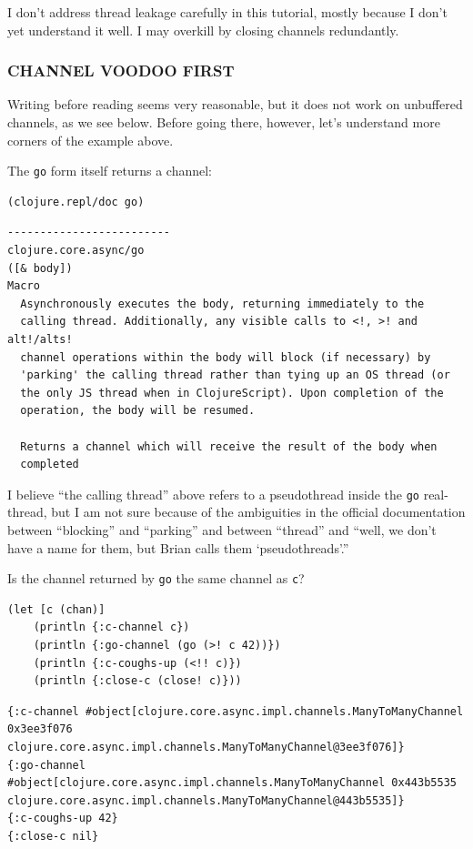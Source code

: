 \documentclass[10pt,oneside,x11names]{article}
\begin{document}
I don't address thread leakage carefully in this tutorial, mostly
because I don't yet understand it well. I may overkill by closing
channels redundantly.

\subsubsection{CHANNEL VOODOO FIRST}
\label{channel-voodoo-first}
Writing before reading seems very reasonable, but it does not work on
unbuffered channels, as we see below. Before going there, however, let's
understand more corners of the example above.

The \texttt{go} form itself returns a channel:

\begin{verbatim}
(clojure.repl/doc go)
\end{verbatim}

\begin{verbatim}
-------------------------
clojure.core.async/go
([& body])
Macro
  Asynchronously executes the body, returning immediately to the
  calling thread. Additionally, any visible calls to <!, >! and alt!/alts!
  channel operations within the body will block (if necessary) by
  'parking' the calling thread rather than tying up an OS thread (or
  the only JS thread when in ClojureScript). Upon completion of the
  operation, the body will be resumed.

  Returns a channel which will receive the result of the body when
  completed
\end{verbatim}

I believe ``the calling thread'' above refers to a pseudothread inside the
\texttt{go} real-thread, but I am not sure because of the ambiguities in the
official documentation between ``blocking'' and ``parking'' and between
``thread'' and ``well, we don't have a name for them, but Brian calls them
`pseudothreads'.''

Is the channel returned by \texttt{go} the same channel as \texttt{c}?

\begin{verbatim}
(let [c (chan)]
    (println {:c-channel c})
    (println {:go-channel (go (>! c 42))})
    (println {:c-coughs-up (<!! c)})
    (println {:close-c (close! c)}))
\end{verbatim}

\begin{verbatim}
{:c-channel #object[clojure.core.async.impl.channels.ManyToManyChannel 0x3ee3f076 clojure.core.async.impl.channels.ManyToManyChannel@3ee3f076]}
{:go-channel #object[clojure.core.async.impl.channels.ManyToManyChannel 0x443b5535 clojure.core.async.impl.channels.ManyToManyChannel@443b5535]}
{:c-coughs-up 42}
{:close-c nil}
\end{verbatim}
\end{document}
